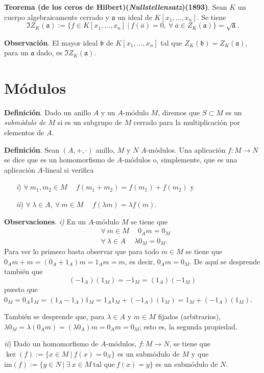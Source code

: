 \documentclass[a4paper,12pt]{article}
\newcommand{\af}{\mathfrak{a}}
\newcommand{\bfr}{\mathfrak{b}}
\begin{document}
\textbf{Teorema (de los ceros de Hilbert)(\textit{Nullstellensatz})(1893)}. Sean $K$ un cuerpo algebraicamente cerrado y $\af$ un ideal de $K[x_1,\dots,x_n]$. Se tiene$$\mathfrak{I}Z_K(\af):=\{f\in K[x_1,\dots,x_n]\ |\ f(\overline{a})=0,\ \forall\ \overline{a}\in Z_K(\af)\}=\sqrt{\af}.$$

\textbf{Observación}. El mayor ideal $\bfr$ de $K[x_1,\dots,x_n]$ tal que $Z_K(\bfr)=Z_K(\af)$, para un $\af$ dado, es $\mathfrak{I}Z_K(\af)$.

\section{Módulos}
\textbf{Definición}. Dado un anillo $A$ y un $A$-módulo $M$, diremos que $S\subset M$ es un \textit{submódulo de $M$} si es un subgrupo de $M$ cerrado para la multiplicación por elementos de $A$.

\textbf{Definición}. Sean $(A,+,\cdot)$ anillo, $M$ y $N$ $A$-módulos. Una aplicación $f:M\longrightarrow N$ se dice que es un homomorfismo de $A$-módulos o, simplemente, que es una aplicación $A$-lineal si verifica
\begin{itemize}
    \item[\textit{i})] $\forall\ m_1,m_2\in M\hspace{15pt} f(m_1+m_2)=f(m_1)+f(m_2)$ y
    \item[\textit{ii})] $\forall\ \lambda\in A,\ \forall\ m\in M\hspace{15pt} f(\lambda m)=\lambda f(m).$
\end{itemize}

\textbf{Observaciones}. \textit{\textit{i})} En un $A$-módulo $M$ se tiene que\begin{align*}
    &\forall\ m\in M \hspace{15pt}0_Am=0_M\\
    &\forall\ \lambda\in A \hspace{15pt}\lambda0_M=0_M.
\end{align*}
Para ver lo primero basta observar que para todo $m\in M$ se tiene que $0_Am+m=(0_A+1_A)m=1_Am=m$, es decir, $0_Am=0_M$. De aquí se desprende también que $$(-1_A)(1_M)=-1_M=(1_A)(-1_M)$$ puesto que $0_M=0_A1_M=(1_A-1_A)1_M=1_A1_M+(-1_A)(1_M)=1_M+(-1_A)(1_M)$.

También se desprende que, para $\lambda\in A$ y $m\in M$ fijados (arbitrarios), $\lambda0_M=\lambda(0_Am)=(\lambda0_A)m=0_Am=0_M$; esto es, la segunda propiedad.

\textit{ii}) Dado un homomorfismo de $A$-módulos, $f:M\longrightarrow N$, se tiene que $\ker(f):=\{x\in M\ |\ f(x)=0_N\}$ es un submódulo de $M$ y que $\text{im}(f):=\{y\in N\ |\ \exists\ x\in M\ \text{tal que}\ f(x)=y\}$ es un submódulo de $N$.
\end{document}
